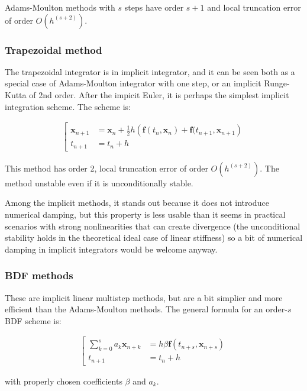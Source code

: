 \documentclass{digitaldynamics}
\def\vect#1{\bm{#1}}
\begin{document}
Adams-Moulton methods with $s$ steps have order $s+1$ and local truncation error of order $O ( h^{(s+2)} )$.


\subsubsection{Trapezoidal method}

The trapezoidal integrator is in implicit integrator, and it can be seen both as a special case of Adams-Moulton integrator with one step, or an implicit Runge-Kutta of 2nd order. After the impicit Euler, it is perhaps the simplest implicit integration scheme.
The scheme is:
\begin{fleqn}
\begin{align}
\left[
\begin{aligned}
\vect{x}_{n+1} &= \vect{x}_n + \tfrac12 h \left( \vect{f}(t_n,\vect{x}_n) + \vect{f}(t_{n+1},\vect{x}_{n+1} \right) \\
t_{n+1} &= t_n + h 
\end{aligned}
\right.
\end{align}
\end{fleqn}
This method has order 2, local truncation error of order $O ( h^{(s+2)} )$. The method unstable even if it is unconditionally stable. 

Among the implicit methods, it stands out because it does not introduce numerical damping, but this property is less usable than it seems in practical scenarios with strong nonlinearities that can create divergence (the unconditional stability holds in the theoretical ideal case of linear stiffness) so a bit of numerical damping in implicit integrators would be welcome anyway.


\subsubsection{BDF methods}

These are implicit linear multistep methods, but are a bit simplier and more efficient than the Adams-Moulton methods. The general formula for an order-$s$ BDF scheme is:
\begin{fleqn}
\begin{align}
\left[
\begin{aligned}
\sum_{k=0}^s a_k \vect{x}_{n+k} &= h \beta \vect{f}(t_{n+s}, \vect{x}_{n+s}) \\
t_{n+1} &= t_n + h 
\end{aligned}
\right.
\end{align}
\end{fleqn}
with properly chosen coefficients $\beta$ and $a_k$.
\end{document}
